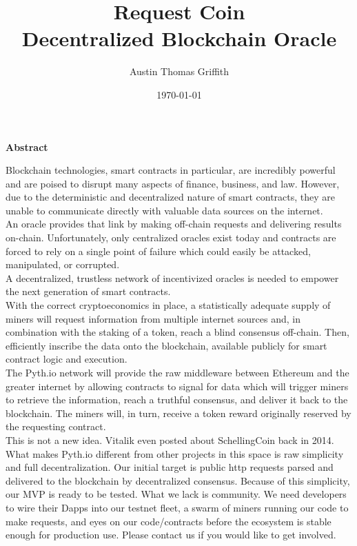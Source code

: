 \documentclass[a4paper,10pt]{article}
\begin{document}
\title{%
  Request Coin \\
  \medbreak
  \small  Decentralized Blockchain Oracle\\
     }

\date{\today}
\author{Austin Thomas Griffith}
\maketitle


\begin{center}
\textbf{Abstract}
\end{center}

Blockchain technologies, smart contracts in particular, are incredibly powerful and are poised to disrupt many aspects of finance, business, and law. However, due to the deterministic and decentralized nature of smart contracts, they are unable to communicate directly with valuable data sources on the internet.\\

An oracle provides that link by making off-chain requests and delivering results on-chain. Unfortunately, only centralized oracles exist today and contracts are forced to rely on a single point of failure which could easily be attacked, manipulated, or corrupted.\\

A decentralized, trustless network of incentivized oracles is needed to empower the next generation of smart contracts.\\

With the correct cryptoeconomics in place, a statistically adequate supply of miners will request information from multiple internet sources and, in combination with the staking of a token, reach a blind consensus off-chain. Then, efficiently inscribe the data onto the blockchain, available publicly for smart contract logic and execution.\\

The Pyth.io network will provide the raw middleware between Ethereum and the greater internet by allowing contracts to signal for data which will trigger miners to retrieve the information, reach a truthful consensus, and deliver it back to the blockchain. The miners will, in turn, receive a token reward originally reserved by the requesting contract.\\

This is not a new idea. Vitalik even posted about SchellingCoin back in 2014. What makes Pyth.io different from other projects in this space is raw simplicity and full decentralization. Our initial target is public http requests parsed and delivered to the blockchain by decentralized consensus. Because of this simplicity, our MVP is ready to be tested. What we lack is community. We need developers to wire their Dapps into our testnet fleet, a swarm of miners running our code to make requests, and eyes on our code/contracts before the ecosystem is stable enough for production use. Please contact us if you would like to get involved.\\
\end{document}
